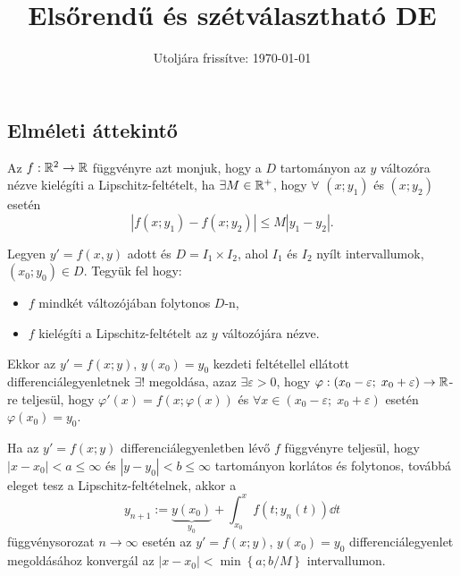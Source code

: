 \documentclass{szb-practice}
\title{Elsőrendű és szétválasztható DE}
\date{Utoljára frissítve: \today}
\begin{document}
\maketitle

\subsection{Elméleti áttekintő}

\begin{definition}
  Az $f : \mathbb{R}^2 \rightarrow \mathbb{R}$ függvényre azt monjuk,
  hogy  a $D$ tartományon az $y$ változóra nézve kielégíti a
  Lipschitz-feltételt, ha $\exists M \in \mathbb{R}^+$, hogy
  $\forall$ $\left( x; y_1 \right)$ és $\left( x; y_2 \right)$ esetén
  $$
    \left| f(x; y_1) - f(x; y_2) \right| \leq M \left| y_1 - y_2 \right|.
  $$
\end{definition}

\begin{theorem}
  Legyen $y' = f(x, y)$ adott és $D = I_1 \times I_2$, ahol $I_1$ és $I_2$ nyílt
  intervallumok, $\left( x_0 ; y_0 \right) \in D$. Tegyük fel hogy:
  \begin{itemize}
    \item $f$ mindkét változójában folytonos $D$-n,
    \item $f$ kielégíti a Lipschitz-feltételt az $y$
          változójára nézve.
  \end{itemize}
  Ekkor az $y' = f(x; y)$, $y(x_0) = y_0$ kezdeti feltétellel
  ellátott differenciálegyenletnek $\exists!$ megoldása, azaz
  $\exists \varepsilon > 0$, hogy $\varphi :
    \left( x_0 - \varepsilon; \; x_0 + \varepsilon \right)
    \rightarrow \mathbb{R}$-re teljesül, hogy $\varphi' (x)
    = f \left(x ; \varphi(x)\right)$ és
  $\forall x \in \left( x_0 - \varepsilon; \; x_0 + \varepsilon \right)$
  esetén $\varphi(x_0) = y_0$.
\end{theorem}

\begin{theorem}
  Ha az $y' = f(x; y)$ differenciálegyenletben lévő $f$ függvényre teljesül,
  hogy $\left| x - x_0 \right| < a \leq \infty$ és $\left| y - y_0 \right| < b
    \leq \infty$ tartományon korlátos és folytonos, továbbá eleget tesz a
  Lipschitz-feltételnek, akkor a
  $$
    y_{n + 1}
    := \underbrace{y(x_0)}_{y_0}
    + \int_{x_0}^x f\left(
    t; y_{n}(t)
    \right) \dd t
  $$
  függvénysorozat $n \rightarrow \infty$ esetén az $y' = f(x; y)$, $y(x_0) =
    y_0$ differenciálegyenlet megoldásához konvergál az  $\left| x - x_0 \right|
    < \min \left\{ a; b/M \right\}$  intervallumon.
\end{theorem}
\end{document}
